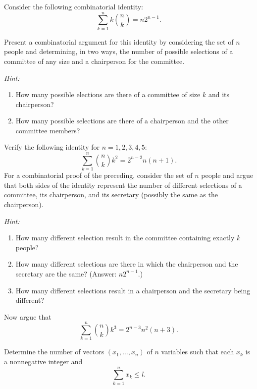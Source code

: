 \begin{problem}[Ross, \S 1, \# 12]
  Consider the following combinatorial identity:
  \[
    \sum_{k=1}^n k\binom{n}{k}=n2^{n-1}.
  \]
  \begin{alphlist}
  \item Present a combinatorial argument for this identity by considering
    the set of \(n\) people and determining, in two ways, the number of
    possible selections of a committee of any size and a chairperson for
    the committee.

    \noindent\emph{Hint:}
    \begin{enumerate}[label=(\roman*)]
    \item How many possible elections are there of a committee of size
      \(k\) and its chairperson?
    \item How many possible selections are there of a chairperson and the
      other committee members?
    \end{enumerate}
  \item Verify the following identity for \(n=1,2,3,4,5\):
    \[
      \sum_{k=1}^n \binom{n}{k}k^2=2^{n-2}n(n+1).
    \]
    For a combinatorial proof of the preceding, consider the set of \(n\)
    people and argue that both sides of the identity represent the number
    of different selections of a committee, its chairperson, and its
    secretary (possibly the same as the chairperson).

    \noindent\emph{Hint:}
    \begin{enumerate}[label=(\roman*)]
    \item How many different selection result in the committee containing
      exactly \(k\) people?
    \item How many different selections are there in which the chairperson
      and the secretary are the same? (Answer: \(n2^{n-1}\).)
    \item How many different selections result in a chairperson and the
      secretary being different?
    \end{enumerate}
  \item Now argue that
    \[
      \sum_{k=1}^n\binom{n}{k}k^3=2^{n-3}n^2(n+3).
    \]
  \end{alphlist}
\end{problem}
\begin{solution*}
\end{solution*}

\begin{problem}[Ross, \S 1, \# 23]
  Determine the number of vectors \((x_1,\dotsc,x_n)\) of \(n\) variables
  such that each \(x_k\) is a nonnegative integer and
  \[
    \sum_{k=1}^n x_k\leq l.
  \]
\end{problem}
\begin{solution*}
\end{solution*}

